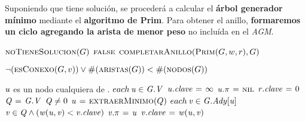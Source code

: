 Suponiendo que tiene solución, se procederá a calcular el \textbf{árbol 
generador mínimo} mediante el \textbf{algoritmo de Prim}. Para obtener el 
anillo, \textbf{formaremos un ciclo agregando la arista de menor peso} no 
incluída en el \textit{AGM}.


\begin{codebox}
\li \If $\textnormal{\scshape noTieneSolucion}(G)$
\li     \Then
            \Return $\textnormal{\scshape false}$
        \End
\li  \Return $\textnormal{\scshape completarAnillo}(\textnormal{\scshape Prim}(G,w,r),G)$
\end{codebox}


\vspace*{0.3cm}


\begin{codebox}
\li \Return $\neg (\textnormal{\scshape esConexo}(G,v)) \lor
    \textnormal{\scshape\#}(\textnormal{\scshape aristas}(G)) < 
    \textnormal{\scshape\#}(\textnormal{\scshape nodos}(G))$
\end{codebox}


\vspace*{0.3cm}


\begin{codebox}
\li \Comment $\id{u}$ es un nodo cualquiera de .
\li \For $each \hspace{0.07cm} \id{u} \in \id{G.V}$
\li     \Do
            $\id{u.clave} \gets \infty$
\li         $\id{u.\pi} \gets \const{nil}$
        \End
\li $\id{r.clave} \gets 0$
\li $\id{Q} \gets \id{G.V}$
\li \While $\id{Q} \neq 0$
\li     \Do
            $\id{u} \gets \proc{extraerMinimo}(Q)$
\li         \For $each \hspace{0.07cm} \id{v} \in \id{G.Ady[u]}$
                \Do
\li                 \If $\id{v} \in \id{Q} \land (\id{w(u,v)} < \id{v.clave})$
\li                     \Then
                            $\id{v.\pi} \gets \id{u}$
\li                         $\id{v.clave} \gets \id{w(u,v)}$
                        \End
                \End
        \End
\end{codebox}


\vspace*{0.3cm}


